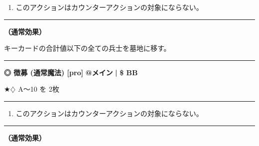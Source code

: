 \documentclass[twocolumn,a5paper,papersize,10pt]{jarticle}
\begin{document}
\vspace{-1zh}%
\begin{enumerate}
\renewcommand{\labelenumi}{※}
\setlength{\leftskip}{-0.3cm}
\setlength{\itemsep}{0pt} %
\setlength{\parskip}{0pt} %

\item このアクションはカウンターアクションの対象にならない。

\vspace{-3mm}%
\end{enumerate}
\vspace{1mm}%
\hrule height 0.1mm depth 0mm width 66.5mm %
\vspace{1mm}%

{\bf（通常効果）}

キーカードの合計値以下の全ての兵士を墓地に移す。
\vspace{2mm} %
\hrule height 0.5mm depth 0mm width 66.5mm %
\vspace{1mm} %
{\normalsize\bf ◎ 徴募 {\scriptsize (通常魔法) [pro]}} %
\hfill 
{\small\bf @メイン }
  {\small\bf | } {\small\bf \$ BB}

★{\normalsize $\diamondsuit$} A〜10 を 2枚

\vspace{1mm}%
\hrule height 0.1mm depth 0mm width 66.5mm %
\vspace{1mm}%


\vspace{-1zh}%
\begin{enumerate}
\renewcommand{\labelenumi}{※}
\setlength{\leftskip}{-0.3cm}
\setlength{\itemsep}{0pt} %
\setlength{\parskip}{0pt} %

\item このアクションはカウンターアクションの対象にならない。

\vspace{-3mm}%
\end{enumerate}
\vspace{1mm}%
\hrule height 0.1mm depth 0mm width 66.5mm %
\vspace{1mm}%

{\bf（通常効果）}
\end{document}
